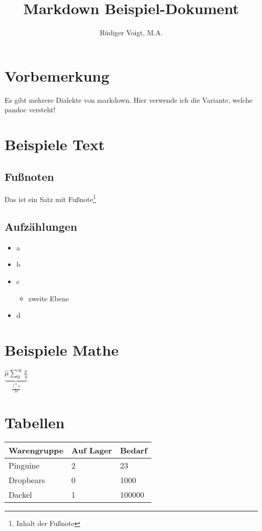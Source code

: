 \documentclass[]{article}
\title{Markdown Beispiel-Dokument}
\author{Rüdiger Voigt, M.A.}
\date{}
\providecommand{\tightlist}{%
  \setlength{\itemsep}{0pt}\setlength{\parskip}{0pt}}
\begin{document}
\maketitle

{
\setcounter{tocdepth}{3}
\tableofcontents
}
\section{Vorbemerkung}\label{vorbemerkung}

Es gibt mehrere Dialekte von markdown. Hier verwende ich die Variante,
welche pandoc versteht!

\newpage

\section{Beispiele Text}\label{beispiele-text}

\subsection{Fußnoten}\label{fuuxdfnoten}

Das ist ein Satz mit Fußnote\footnote{Inhalt der Fußnote}

\subsection{Aufzählungen}\label{aufzuxe4hlungen}

\begin{itemize}
\tightlist
\item
  a
\item
  b
\item
  c

  \begin{itemize}
  \tightlist
  \item
    zweite Ebene
  \end{itemize}
\item
  d
\end{itemize}

\section{Beispiele Mathe}\label{beispiele-mathe}

\(\underbrace{\hat{\mu} \sum_{0}^{\infty} \frac{x}{y}}_{\frac{\int_1^{\infty}\omega}{23}}\)

\section{Tabellen}\label{tabellen}

\begin{longtable}[]{@{}lll@{}}
\toprule
Warengruppe & Auf Lager & Bedarf\tabularnewline
\midrule
\endhead
Pinguine & 2 & 23\tabularnewline
Dropbears & 0 & 1000\tabularnewline
Dackel & 1 & 100000\tabularnewline
\bottomrule
\end{longtable}
\end{document}
